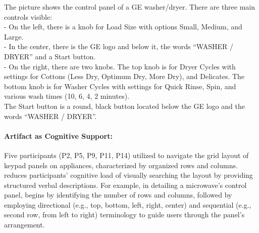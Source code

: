 




\begin{mybox}
The picture shows the control panel of a GE washer/dryer. There are three main controls visible:\\
- On the left, there is a knob for Load Size with options Small, Medium, and Large.\\
- In the center, there is the GE logo and below it, the words ``WASHER / DRYER'' and a Start button.\\
- On the right, there are two knobs. The top knob is for Dryer Cycles with settings for Cottons (Less Dry, Optimum Dry, More Dry), and Delicates. The bottom knob is for Washer Cycles with settings for Quick Rinse, Spin, and various wash times (10, 6, 4, 2 minutes).\\
The Start button is a round, black button located below the GE logo and the words ``WASHER / DRYER''.
\end{mybox}


\paragraph{Artifact as Cognitive Support:}


Five participants (P2, P5, P9, P11, P14) utilized \bma{} to navigate the grid layout of keypad panels on appliances, characterized by organized rows and columns. 
% 
\bma{} reduces participants' cognitive load of visually searching the layout by providing structured verbal descriptions.
% 
For example, in detailing a microwave's control panel, \bma{} begins by identifying the number of rows and columns, followed by employing directional (e.g., top, bottom, left, right, center) and sequential (e.g., second row, from left to right) terminology to guide users through the panel's arrangement. 

